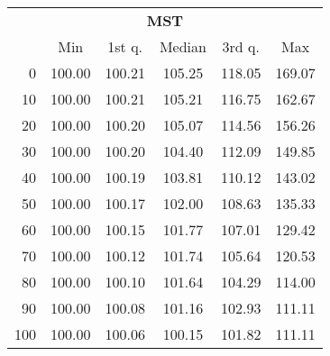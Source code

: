 \begin{tabular}{r|ccccc}
  \multicolumn{6}{c}{{\bf MST}} \\
  & Min & 1st q. & Median & 3rd q. & Max \\ \hline\hline
  0 & 100.00 & 100.21 & 105.25 & 118.05 & 169.07
\\ 10 & 100.00 & 100.21 & 105.21 & 116.75 & 162.67
\\ 20 & 100.00 & 100.20 & 105.07 & 114.56 & 156.26
\\ 30 & 100.00 & 100.20 & 104.40 & 112.09 & 149.85
\\ 40 & 100.00 & 100.19 & 103.81 & 110.12 & 143.02
\\ 50 & 100.00 & 100.17 & 102.00 & 108.63 & 135.33
\\ 60 & 100.00 & 100.15 & 101.77 & 107.01 & 129.42
\\ 70 & 100.00 & 100.12 & 101.74 & 105.64 & 120.53
\\ 80 & 100.00 & 100.10 & 101.64 & 104.29 & 114.00
\\ 90 & 100.00 & 100.08 & 101.16 & 102.93 & 111.11
\\ 100 & 100.00 & 100.06 & 100.15 & 101.82 & 111.11
\end{tabular}
